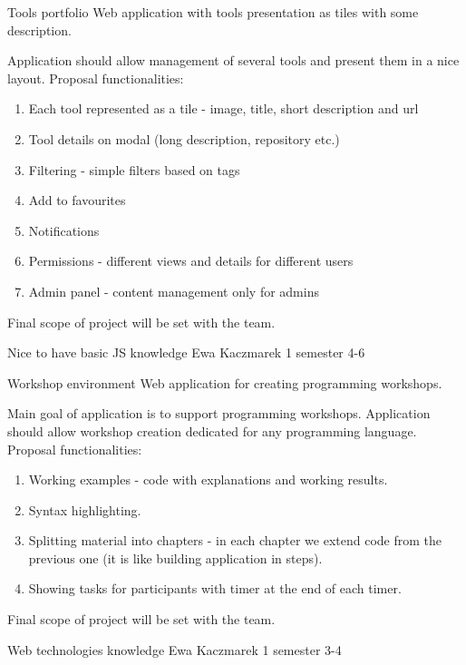 \begin{project}
{Tools portfolio}
{Web application with tools presentation as tiles with some description.} 
{
Application should allow management of several tools and present them in a nice layout.
\bigbreak
Proposal functionalities:
\begin{enumerate}
	\item Each tool represented as a tile - image, title, short description and url
	\item Tool details on modal (long description, repository etc.)
	\item Filtering - simple filters based on tags
	\item Add to favourites
	\item Notifications
	\item Permissions - different views and details for different users
	\item Admin panel - content management only for admins
\end{enumerate}

Final scope of project will be set with the team.
}
{Nice to have basic JS knowledge}
{Ewa Kaczmarek}
{1 semester}
{4-6}
\end{project}
\begin{project}
{Workshop environment}
{Web application for creating programming workshops.} 
{
Main goal of application is to support programming workshops. Application should allow workshop creation dedicated for any programming language.
\bigbreak
Proposal functionalities:
\begin{enumerate}
	\item Working examples - code with explanations and working results.
	\item Syntax highlighting.
	\item Splitting material into chapters - in each chapter we extend code from the previous one (it is like building application in steps).
	\item Showing tasks for participants with timer at the end of each timer.
\end{enumerate}
 
Final scope of project will be set with the team.
}
{Web technologies knowledge}
{Ewa Kaczmarek}
{1 semester}
{3-4}
\end{project}
